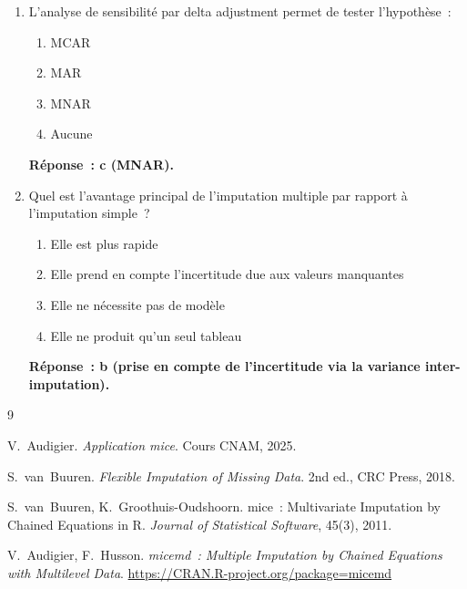 \documentclass[a4paper,11pt]{article}
\theoremstyle{definition}
\theoremstyle{remark}
\begin{document}
\begin{enumerate}
  \item L'analyse de sensibilit\'e par delta adjustment permet de
    tester l'hypoth\`ese~:
    \begin{enumerate}
      \item MCAR
      \item MAR
      \item MNAR
      \item Aucune
    \end{enumerate}
    \textbf{R\'eponse~: c (MNAR).}

  \item Quel est l'avantage principal de l'imputation multiple par
    rapport \`a l'imputation simple~?
    \begin{enumerate}
      \item Elle est plus rapide
      \item Elle prend en compte l'incertitude due aux valeurs
        manquantes
      \item Elle ne n\'ecessite pas de mod\`ele
      \item Elle ne produit qu'un seul tableau
    \end{enumerate}
    \textbf{R\'eponse~: b (prise en compte de l'incertitude via la
    variance inter-imputation).}

\end{enumerate}

\begin{thebibliography}{9}

  V.~Audigier.
  \newblock \emph{Application mice}.
  \newblock Cours CNAM, 2025.

  S.~van~Buuren.
  \newblock \emph{Flexible Imputation of Missing Data}.
  \newblock 2nd ed., CRC Press, 2018.

  S.~van~Buuren, K.~Groothuis-Oudshoorn.
  \newblock mice~: Multivariate Imputation by Chained Equations in R.
  \newblock \emph{Journal of Statistical Software}, 45(3), 2011.

  V.~Audigier, F.~Husson.
  \newblock \emph{micemd~: Multiple Imputation by Chained Equations
    with Multilevel Data}.
  \newblock \url{https://CRAN.R-project.org/package=micemd}

\end{thebibliography}
\end{document}
